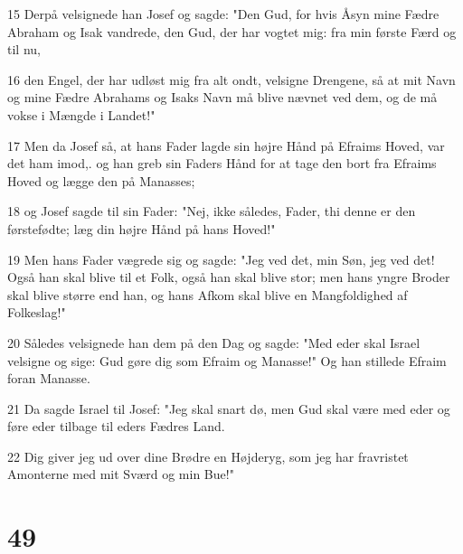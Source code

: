 \par 15 Derpå velsignede han Josef og sagde: "Den Gud, for hvis Åsyn mine Fædre Abraham og Isak vandrede, den Gud, der har vogtet mig: fra min første Færd og til nu,
\par 16 den Engel, der har udløst mig fra alt ondt, velsigne Drengene, så at mit Navn og mine Fædre Abrahams og Isaks Navn må blive nævnet ved dem, og de må vokse i Mængde i Landet!"
\par 17 Men da Josef så, at hans Fader lagde sin højre Hånd på Efraims Hoved, var det ham imod,. og han greb sin Faders Hånd for at tage den bort fra Efraims Hoved og lægge den på Manasses;
\par 18 og Josef sagde til sin Fader: "Nej, ikke således, Fader, thi denne er den førstefødte; læg din højre Hånd på hans Hoved!"
\par 19 Men hans Fader vægrede sig og sagde: "Jeg ved det, min Søn, jeg ved det! Også han skal blive til et Folk, også han skal blive stor; men hans yngre Broder skal blive større end han, og hans Afkom skal blive en Mangfoldighed af Folkeslag!"
\par 20 Således velsignede han dem på den Dag og sagde: "Med eder skal Israel velsigne og sige: Gud gøre dig som Efraim og Manasse!" Og han stillede Efraim foran Manasse.
\par 21 Da sagde Israel til Josef: "Jeg skal snart dø, men Gud skal være med eder og føre eder tilbage til eders Fædres Land.
\par 22 Dig giver jeg ud over dine Brødre en Højderyg, som jeg har fravristet Amonterne med mit Sværd og min Bue!"

\chapter{49}

